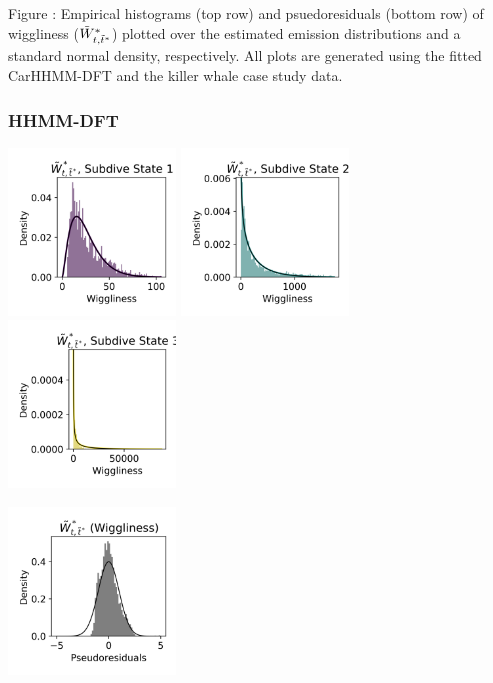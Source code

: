 \documentclass{article}
\begin{document}
        \noindent Figure : Empirical histograms (top row) and psuedoresiduals (bottom row) of wiggliness ($\tilde{W}^*_{t,\tilde t^*}$) plotted over the estimated emission distributions and a standard normal density, respectively. All plots are generated using the fitted CarHHMM-DFT and the killer whale case study data.
        \addtocounter{fignum}{1}
        
        \subsubsection{HHMM-DFT}
        
        \begin{center}
        \includegraphics[width=1.75in]{../Plots/HHMM_empirical_hist_ahat_0.png}
        \includegraphics[width=1.75in]{../Plots/HHMM_empirical_hist_ahat_1.png}
        \includegraphics[width=1.75in]{../Plots/HHMM_empirical_hist_ahat_2.png}
        
        \includegraphics[width=1.75in]{../Plots/HHMM_psedoresids_ahat.png}
        \end{center}
        
\end{document}
